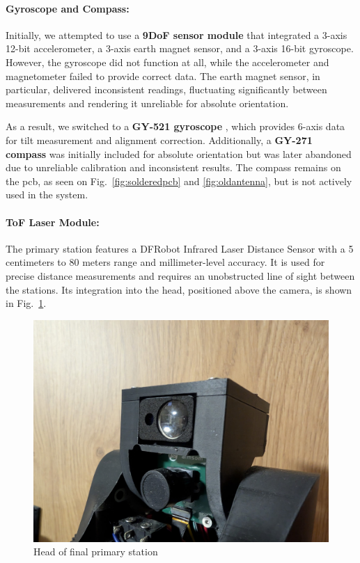 \paragraph{Gyroscope and Compass:}

Initially, we attempted to use a \textbf{9DoF sensor module} \citep{jwbl_dof_sensor} that integrated a 3-axis 12-bit accelerometer, a 3-axis earth magnet sensor, and a 3-axis 16-bit gyroscope. However, the gyroscope did not function at all, while the accelerometer and magnetometer failed to provide correct data. The earth magnet sensor, in particular, delivered inconsistent readings, fluctuating significantly between measurements and rendering it unreliable for absolute orientation.

As a result, we switched to a \textbf{GY-521 gyroscope} \cite{azdelivery_gy_521}, which provides 6-axis data for tilt measurement and alignment correction. Additionally, a \textbf{GY-271 compass} \cite{azdelivery_gy_271} was initially included for absolute orientation but was later abandoned due to unreliable calibration and inconsistent results. The compass remains on the \acrshort{pcb}, as seen on Fig.~\ref{fig:solderedpcb} and \ref{fig:oldantenna}, but is not actively used in the system.

\paragraph{ToF Laser Module:}
The primary station features a DFRobot Infrared Laser Distance Sensor \cite{dfrobot_ir_sensor} with a 5 centimeters to 80 meters range and millimeter-level accuracy. It is used for precise distance measurements and requires an unobstructed line of sight between the stations. Its integration into the head, positioned above the camera, is shown in Fig.~\ref{fig:headcloseup}.

\begin{figure}[H]
	\centering
	\includegraphics[width=1.0\linewidth]{figures/head_closeup}
	\caption{Head of final primary station}
	\label{fig:headcloseup}
\end{figure}

